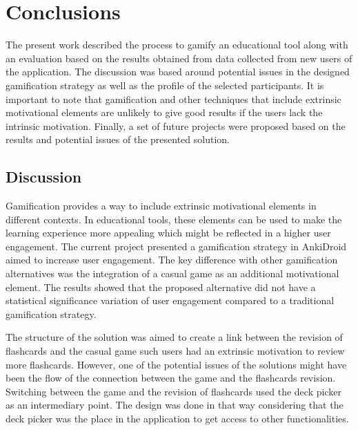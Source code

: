 
\chapter{Conclusions} %

\label{conc} %


The present work described the process to gamify an educational tool along with an evaluation based on the results obtained from data collected from new users of the application. The discussion was based around potential issues in the designed gamification strategy as well as the profile of the selected participants. It is important to note that gamification and other techniques that include extrinsic motivational elements are unlikely to give good results if the users lack the intrinsic motivation. Finally, a set of future projects were proposed based on the results and potential issues of the presented solution.

\section{Discussion}
Gamification provides a way to include extrinsic motivational elements in different contexts. In educational tools, these elements can be used to make the learning experience more appealing which might be reflected in a higher user engagement. The current project presented a gamification strategy in AnkiDroid aimed to increase user engagement. The key difference with other gamification alternatives was the integration of a casual game as an additional motivational element. The results showed that the proposed alternative did not have a statistical significance variation of user engagement compared to a traditional gamification strategy.

The structure of the solution was aimed to create a link between the revision of flashcards and the casual game such users had an extrinsic motivation to review more flashcards. However, one of the potential issues of the solutions might have been the flow of the connection between the game and the flashcards revision. Switching between the game and the revision of flashcards used the deck picker as an intermediary point. The design was done in that way considering that the deck picker was the place in the application to get access to other functionalities.


